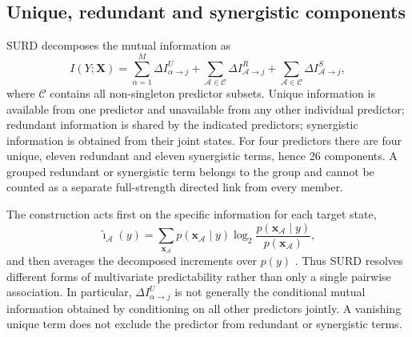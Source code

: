 \documentclass[fleqn,usenatbib]{mnras}
\begin{document}
\subsection{Unique, redundant and synergistic components}
SURD decomposes the mutual information as
\begin{equation}
I(Y;\mathbf{X})=
\sum_{\alpha=1}^{M}\Delta I^U_{\alpha\to j}
+\sum_{\mathcal{A}\in\mathcal{C}}\Delta I^R_{\mathcal{A}\to j}
+\sum_{\mathcal{A}\in\mathcal{C}}\Delta I^S_{\mathcal{A}\to j},
\label{eq:surd_master}
\end{equation}
where $\mathcal{C}$ contains all non-singleton predictor subsets. Unique information is available from one predictor and unavailable from any other individual predictor; redundant information is shared by the indicated predictors; synergistic information is obtained from their joint states. For four predictors there are four unique, eleven redundant and eleven synergistic terms, hence 26 components. A grouped redundant or synergistic term belongs to the group and cannot be counted as a separate full-strength directed link from every member.

The construction acts first on the specific information for each target state,
\begin{equation}
\tilde{\imath}_{\mathcal{A}}(y)=
\sum_{\mathbf{x}_{\mathcal{A}}}p(\mathbf{x}_{\mathcal{A}}\mid y)
\log_2\frac{p(\mathbf{x}_{\mathcal{A}}\mid y)}{p(\mathbf{x}_{\mathcal{A}})},
\end{equation}
and then averages the decomposed increments over $p(y)$ \citep{MartinezSanchez2024SURD,MartinezSanchez2025Thesis}. Thus SURD resolves different forms of multivariate predictability rather than only a single pairwise association. In particular, $\Delta I^U_{\alpha\to j}$ is not generally the conditional mutual information obtained by conditioning on all other predictors jointly. A vanishing unique term does not exclude the predictor from redundant or synergistic terms.
\end{document}
